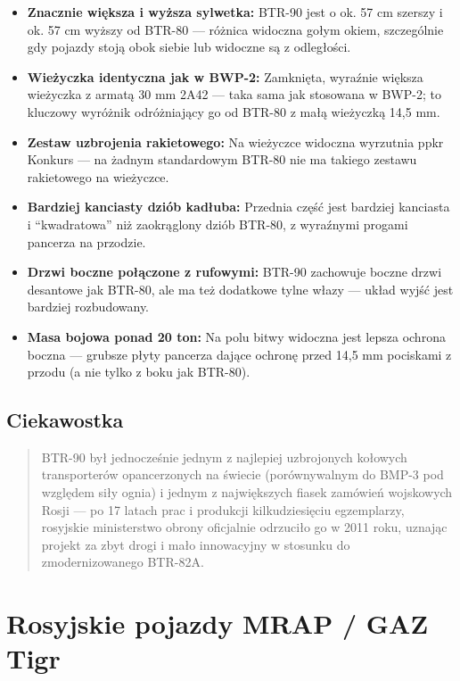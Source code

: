 \documentclass[12pt,openany,oneside]{book}
\providecommand{\tightlist}{%
  \setlength{\itemsep}{0pt}\setlength{\parskip}{0pt}}
\begin{document}
\begin{itemize}
\tightlist
\item
  \textbf{Znacznie większa i wyższa sylwetka:} BTR-90 jest o ok. 57 cm
  szerszy i ok. 57 cm wyższy od BTR-80 --- różnica widoczna gołym okiem,
  szczególnie gdy pojazdy stoją obok siebie lub widoczne są z
  odległości.
\item
  \textbf{Wieżyczka identyczna jak w BWP-2:} Zamknięta, wyraźnie większa
  wieżyczka z armatą 30 mm 2A42 --- taka sama jak stosowana w BWP-2; to
  kluczowy wyróżnik odróżniający go od BTR-80 z małą wieżyczką 14,5 mm.
\item
  \textbf{Zestaw uzbrojenia rakietowego:} Na wieżyczce widoczna
  wyrzutnia ppkr Konkurs --- na żadnym standardowym BTR-80 nie ma
  takiego zestawu rakietowego na wieżyczce.
\item
  \textbf{Bardziej kanciasty dziób kadłuba:} Przednia część jest
  bardziej kanciasta i ``kwadratowa'' niż zaokrąglony dziób BTR-80, z
  wyraźnymi progami pancerza na przodzie.
\item
  \textbf{Drzwi boczne połączone z rufowymi:} BTR-90 zachowuje boczne
  drzwi desantowe jak BTR-80, ale ma też dodatkowe tylne włazy --- układ
  wyjść jest bardziej rozbudowany.
\item
  \textbf{Masa bojowa ponad 20 ton:} Na polu bitwy widoczna jest lepsza
  ochrona boczna --- grubsze płyty pancerza dające ochronę przed 14,5 mm
  pociskami z przodu (a nie tylko z boku jak BTR-80).
\end{itemize}

\section{Ciekawostka}\label{ciekawostka-7}

\begin{quote}
BTR-90 był jednocześnie jednym z najlepiej uzbrojonych kołowych
transporterów opancerzonych na świecie (porównywalnym do BMP-3 pod
względem siły ognia) i jednym z największych fiasek zamówień wojskowych
Rosji --- po 17 latach prac i produkcji kilkudziesięciu egzemplarzy,
rosyjskie ministerstwo obrony oficjalnie odrzuciło go w 2011 roku,
uznając projekt za zbyt drogi i mało innowacyjny w stosunku do
zmodernizowanego BTR-82A.
\end{quote}

\chapter{Rosyjskie pojazdy MRAP / GAZ
Tigr}\label{rosyjskie-pojazdy-mrap-gaz-tigr}
\end{document}

